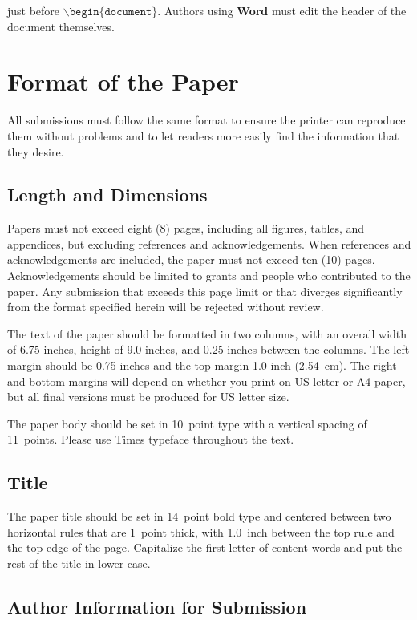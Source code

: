 \documentclass{article}
\begin{document}
just before $\mathtt{\backslash begin\{document\}}$.
Authors using \textbf{Word} must edit the header of the document themselves.

\section{Format of the Paper} 
 
All submissions must follow the same format to ensure the printer can
reproduce them without problems and to let readers more easily find
the information that they desire.

\subsection{Length and Dimensions}

Papers must not exceed eight (8) pages, including all figures, tables,
and appendices, but excluding references and acknowledgements. When references and acknowledgements are included,
the paper must not exceed ten (10) pages.
Acknowledgements should be limited to grants and people who contributed to the paper.
Any submission that exceeds 
this page limit or that diverges significantly from the format specified 
herein will be rejected without review.

The text of the paper should be formatted in two columns, with an
overall width of 6.75 inches, height of 9.0 inches, and 0.25 inches
between the columns. The left margin should be 0.75 inches and the top
margin 1.0 inch (2.54~cm). The right and bottom margins will depend on
whether you print on US letter or A4 paper, but all final versions
must be produced for US letter size.

The paper body should be set in 10~point type with a vertical spacing
of 11~points. Please use Times typeface throughout the text.

\subsection{Title}

The paper title should be set in 14~point bold type and centered
between two horizontal rules that are 1~point thick, with 1.0~inch
between the top rule and the top edge of the page. Capitalize the
first letter of content words and put the rest of the title in lower
case.

\subsection{Author Information for Submission}
\label{author info}
\end{document}
